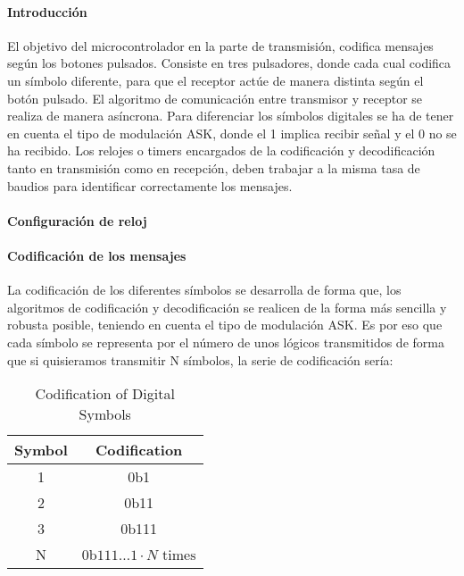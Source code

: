 \paragraph{Introducción} El objetivo del microcontrolador en la parte de transmisión, codifica mensajes según los botones pulsados.
Consiste en tres pulsadores, donde cada cual codifica un símbolo diferente, para que el receptor actúe de manera distinta según el botón pulsado. El algoritmo de comunicación entre transmisor y receptor se realiza de manera asíncrona. Para diferenciar los símbolos digitales se ha de tener en cuenta el tipo de modulación ASK, donde el 1 implica recibir señal y el 0 no se ha recibido. 
Los relojes o timers encargados de la codificación y decodificación tanto en transmisión como en recepción, deben trabajar a la misma tasa de baudios para identificar correctamente los mensajes.

\paragraph{Configuraci\'on de reloj} 
\paragraph{Codificaci\'on de los mensajes} 
La codificación de los diferentes símbolos se desarrolla de forma que, los algoritmos de codificación y decodificación se realicen de la forma más sencilla y robusta posible, teniendo en cuenta el tipo de modulación ASK.
Es por eso que cada símbolo se representa por el número de unos lógicos transmitidos de forma que si quisieramos transmitir N símbolos, la serie de codificación sería:
\begin{table}[ht]
    \centering
    \begin{tabular}{|c|c|}
        \hline
        \textbf{Symbol} & \textbf{Codification} \\ 
        \hline
        1 & 0b1 \\ 
        2 & 0b11 \\ 
        3 & 0b111 \\ 
        N & 0b$111 \ldots 1 \cdot N \text{ times} $ \\ 
        \hline
    \end{tabular}
    \caption{Codification of Digital Symbols}
\end{table}


